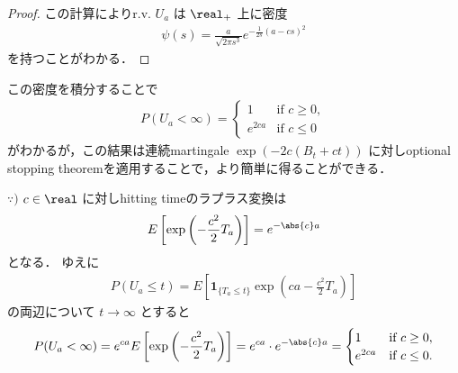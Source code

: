 \documentclass{jsarticle}
\begin{document}
\begin{proof}
    この計算によりr.v. $U_a$ は $\real_+$ 上に密度
    \begin{align}
        \psi(s)
        = \frac{a}{\sqrt{2\pi s^3}}e^{-\frac{1}{2s}(a-cs)^2}
    \end{align}
    を持つことがわかる．
\end{proof}

この密度を積分することで
\begin{align}
    P(U_a<\infty)=
    \begin{cases}
        1 &\text{if } c\ge0, \\
        e^{2ca} &\text{if } c\le0
    \end{cases}
\end{align}
がわかるが，この結果は連続martingale $\exp{(-2c(B_t+ct))}$ に対しoptional stopping theoremを適用することで，より簡単に得ることができる．
\begin{screen}
    $\because)$
    $c\in\real$ に対しhitting timeのラプラス変換は
    \begin{align}
        E\left[\exp\left(-\frac{c^2}{2}T_a\right)\right]
        = e^{-\abs{c}a}
    \end{align}
    となる．
    ゆえに
    \begin{align}
        P(U_a\le t)=E\left[\bm{1}_{\{T_a\le t\}}\exp\left(ca-\frac{c^2}{2}T_a\right)\right]
    \end{align}
    の両辺について $t\to\infty$ とすると
    \begin{align}
        P(U_a<\infty)
        = e^{ca} E\left[\exp\left(-\frac{c^2}{2}T_a\right)\right]
        = e^{ca}\cdot e^{-\abs{c}a} =
        \begin{cases}
            1 &\text{if } c\ge0, \\
            e^{2ca} &\text{if } c\le0.
        \end{cases}
    \end{align}
\end{screen}
\end{document}
